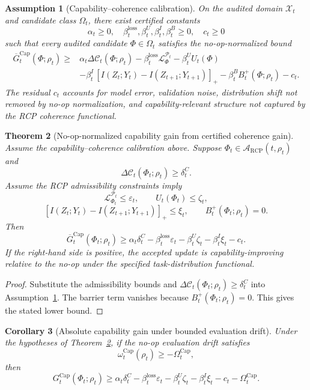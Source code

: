 \documentclass[11pt]{article}
\newtheorem{theorem}{Theorem}[section]
\newtheorem{corollary}[theorem]{Corollary}
\newtheorem{assumption}[theorem]{Assumption}
\newcommand{\Acal}{\mathcal{A}}
\newcommand{\Pcal}{\mathcal{P}}
\newcommand{\Xcal}{\mathcal{X}}
\newcommand{\Ccal}{\mathcal{C}}
\newcommand{\Lcal}{\mathcal{L}}
\newcommand{\1}{\mathbf{1}}
\newcommand{\eps}{\varepsilon}
\newcommand{\RCP}{\mathrm{RCP}}
\newcommand{\loss}{\mathrm{loss}}
\renewcommand{\Cap}{\operatorname{Cap}}
\begin{document}
\begin{assumption}[Capability--coherence calibration]
\label{ass:capability_coherence_calibration}
On the audited domain \(\Xcal_t\) and candidate class \(\Omega_t\), there exist certified constants
\[
\alpha_t\ge0,
\quad
\beta_t^{\loss},\beta_t^U,\beta_t^I,\beta_t^B\ge0,
\quad
c_t\ge0
\]
such that every audited candidate \(\Phi\in\Omega_t\) satisfies the no-op-normalized bound
\[
\begin{aligned}
\overline G^{\Cap}_t(\Phi;\rho_t)
\ge{}&
\alpha_t\Delta\Ccal_t(\Phi;\rho_t)
-
\beta_t^{\loss}\Lcal^{\Pcal_t}_{\Phi}
-
\beta_t^U U_t(\Phi)\\
&-
\beta_t^I\,[I(Z_t;Y_t)-I(Z_{t+1};Y_{t+1})]_+
-
\beta_t^B B_t^+(\Phi;\rho_t)
-c_t.
\end{aligned}
\]
The residual \(c_t\) accounts for model error, validation noise, distribution shift not removed by no-op normalization, and capability-relevant structure not captured by the RCP coherence functional.
\end{assumption}

\begin{theorem}[No-op-normalized capability gain from certified coherence gain]
\label{thm:capability_coherence_coupling}
Assume the capability--coherence calibration above.  Suppose \(\Phi_t\in\Acal_{\RCP}(t,\rho_t)\) and
\[
\Delta\Ccal_t(\Phi_t;\rho_t)\ge\delta_t^C.
\]
Assume the RCP admissibility constraints imply
\[
\Lcal^{\Pcal_t}_{\Phi_t}\le\eps_t,
\qquad
U_t(\Phi_t)\le\zeta_t,
\]
\[
[I(Z_t;Y_t)-I(Z_{t+1};Y_{t+1})]_+\le\xi_t,
\qquad
B_t^+(\Phi_t;\rho_t)=0.
\]
Then
\[
\overline G^{\Cap}_t(\Phi_t;\rho_t)
\ge
\alpha_t\delta_t^C
-
\beta_t^{\loss}\eps_t
-
\beta_t^U\zeta_t
-
\beta_t^I\xi_t
-c_t.
\]
If the right-hand side is positive, the accepted update is capability-improving relative to the no-op under the specified task-distribution functional.
\end{theorem}

\begin{proof}
Substitute the admissibility bounds and \(\Delta\Ccal_t(\Phi_t;\rho_t)\ge\delta_t^C\) into Assumption~\ref{ass:capability_coherence_calibration}.  The barrier term vanishes because \(B_t^+(\Phi_t;\rho_t)=0\).  This gives the stated lower bound.
\end{proof}

\begin{corollary}[Absolute capability gain under bounded evaluation drift]
\label{cor:absolute_capability_gain_with_drift}
Under the hypotheses of Theorem~\ref{thm:capability_coherence_coupling}, if the no-op evaluation drift satisfies
\[
\omega_t^{\Cap}(\rho_t)\ge-\Omega_t^{\Cap},
\]
then
\[
G^{\Cap}_t(\Phi_t;\rho_t)
\ge
\alpha_t\delta_t^C
-
\beta_t^{\loss}\eps_t
-
\beta_t^U\zeta_t
-
\beta_t^I\xi_t
-c_t
-
\Omega_t^{\Cap}.
\]
\end{corollary}
\end{document}
